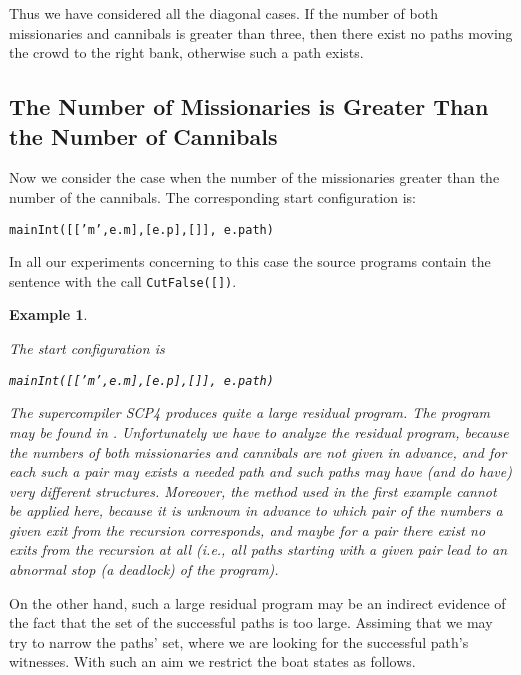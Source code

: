 \documentclass[preprint]{sigplanconf}
\newtheorem{example}{Example}
\begin{document}
Thus we have considered all the diagonal cases. If the number of both missionaries and cannibals is greater than three, then there exist no paths moving the crowd to the right bank, otherwise such a path exists.

\subsection{The Number of Missionaries is Greater Than the Number of Cannibals}

Now we consider the case when the number of the missionaries greater 
than the number of the cannibals. The corresponding start configuration is: 
\begin{center}
\texttt{mainInt([['m',e.m],[e.p],[]], e.path)}
\end{center}

In all our experiments concerning to this case the source programs contain the sentence with the call \texttt{CutFalse([])}.

\begin{example}\label{Example5}

The start configuration is 
\begin{center}
\texttt{mainInt([['m',e.m],[e.p],[]], e.path)}
\end{center}
The supercompiler SCP4 produces 
quite a large residual program. The program may be found in \cite{Lis_Nem:MissionariesAttachment}. Unfortunately we have to analyze the residual program, because the numbers of both missionaries and cannibals are not given in advance, and for each such a pair may exists a needed path and such paths may have (and do have) 
very different structures. Moreover, the method used in the first example cannot be applied here, because it is unknown in advance to which pair of the numbers a given exit from the recursion corresponds, and maybe for a pair there exist no exits from the recursion at all (i.e., all paths starting with a given pair lead to an abnormal stop (a deadlock) of the program). 

\end{example}

On the other hand, such a large residual program may be an indirect evidence of the fact that the set of the successful paths is too large. 
Assiming that we may try to narrow the paths' set, where we are looking for the successful path's witnesses. With such an aim we restrict the boat states as follows. 
\end{document}
